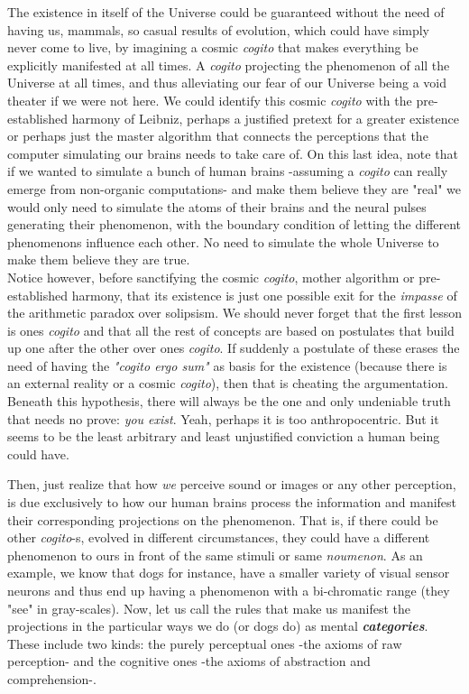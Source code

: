 \documentclass[11pt, a4paper]{article} %
\DeclareRobustCommand{\mybox}[2][gray!10]{%
\begin{tcolorbox}[   %
        left=0.2cm,
        right=0.2cm,
        top=0.15cm,
        bottom=0.15cm,
        colback=#1,
        colframe=#1,
        width=\dimexpr\textwidth\relax, 
        enlarge left by=0mm,
        boxsep=5pt,
        arc=0pt,outer arc=0pt,
        ]
        #2
\end{tcolorbox}
}
\begin{document}
\mybox{ The existence in itself of the Universe could be guaranteed without the need of having us, mammals, so casual results of evolution, which could have simply never come to live, by imagining a cosmic {\em cogito} that makes everything be explicitly manifested at all times. A {\em cogito} projecting the phenomenon of all the Universe at all times, and thus alleviating our fear of our Universe being a void theater if we were not here. We could identify this cosmic {\em cogito} with the pre-established harmony of Leibniz, perhaps a justified pretext for a greater existence or perhaps just the master algorithm that connects the perceptions that the computer simulating our brains needs to take care of. On this last idea, note that if we wanted to simulate a bunch of human brains -assuming a {\em cogito} can really emerge from non-organic computations- and make them believe they are "real" we would only need to simulate the atoms of their brains and the neural pulses generating their phenomenon, with the boundary condition of letting the different phenomenons influence each other. No need to simulate the whole Universe to make them believe they are true. \vspace{-0.2cm} \\

Notice however, before sanctifying the cosmic {\em cogito}, mother algorithm or pre-established harmony, that its existence is just one possible exit for the {\em impasse} of the arithmetic paradox over solipsism. We should never forget that the first lesson is ones {\em cogito} and that all the rest of concepts are based on postulates that build up one after the other over ones {\em cogito}. If suddenly a postulate of these erases the need of having the {\em "cogito ergo sum"} as basis for the existence (because there is an external reality or a cosmic {\em cogito}), then that is cheating the argumentation. Beneath this hypothesis, there will always be the one and only undeniable truth that needs no prove: {\em you exist}. Yeah, perhaps it is too anthropocentric. But it seems to be the least arbitrary and least unjustified conviction a human being could have.\vspace{-0.1cm}
}

Then, just realize that how {\em we} perceive sound or images or any other perception, is due exclusively to how our human brains process the information and manifest their corresponding projections on the phenomenon. That is, if there could be other {\em cogito}-s, evolved in different circumstances, they could have a different phenomenon to ours in front of the same stimuli or same {\em noumenon}. As an example, we know that dogs for instance, have a smaller variety of visual sensor neurons and thus end up having a phenomenon with a bi-chromatic range (they "see" in gray-scales). Now, let us call the rules that make us manifest the projections in the particular ways we do (or dogs do) as mental {\em \bf categories}. These include two kinds: the purely perceptual ones -the axioms of raw perception- and the cognitive ones -the axioms of abstraction and comprehension-. \vspace{-0.1cm}
\end{document}
